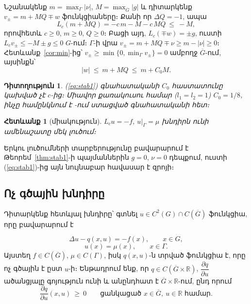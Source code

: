 \documentclass[12pt,a4paper]{article}
\makeatletter
\theoremstyle{arm}
\newtheorem{corollary}{Հետևանք}
\theoremstyle{armdef}
\newtheorem{remark}{Դիտողություն}
\renewcommand{\proofname}{Ապացույց։}
\renewenvironment{proof}[1][\proofname]{\par\pushQED{\qed}\normalfont\topsep6\p@\@plus6\p@\relax
  \trivlist\item[\hskip\labelsep\bfseries #1]\ignorespaces}{\popQED\endtrivlist\@endpefalse}
\numberwithin{equation}{section}
\newcommand{\G}{\overline{G}}
\newcommand{\dd}[2]{\dfrac{\partial #1}{\partial #2}}
\makeatother
\begin{document}
\begin{proof}
Նշանակենք $m=\max_\Gamma|\nu|$, $M=\max_{\G}|g|$ և դիտարկենք $v_{\pm}=m+MQ\mp w$ ֆունկցիաները։ Քանի որ $\Delta Q=-1$, ապա
\[L_c(m+MQ)=-c\,m-M-c\,MQ\ \le\ -M,\]
որովհետև $c\ge0$, $m\ge0$, $Q\ge0$։ Բացի այդ, $L_c(\mp w)=\pm g$, ուստի $L_cv_\pm\le-M\pm g\le0$ $G$-ում։ $\Gamma$-ի վրա $v_\pm=m+MQ\mp\nu\ge m-|\nu|\ge0$։ Հետևանք~\ref{cor:min}-ից՝ $v_\pm\ge\min\{0,\min_\Gamma v_\pm\}=0$ ամբողջ $\G$-ում, այսինքն՝
\begin{equation*}
|w|\ \le\ m+MQ\ \le\ m+C_0M.
\end{equation*}
\end{proof}

\begin{remark}
(\ref{eq:stab1}) գնահատականի $C_0$ հաստատունը կախված չէ $c$-ից։ Միավոր քառակուսու համար ($l_1=l_2=1$) $C_0=1/8$, ինչը համընկնում է \cite[էջ~548]{bakh}-ում ստացված գնահատականի հետ։
\end{remark}

\begin{corollary}[միակություն]\label{cor:uniq1}
$L_cu=-f$, $u|_\Gamma=\mu$ խնդիրն ունի ամենաշատը մեկ լուծում։
\end{corollary}

\begin{proof}
Երկու լուծումների տարբերությունը բավարարում է Թեորեմ~\ref{thm:stab1}-ի պայմաններին $g=0$, $\nu=0$ դեպքում, ուստի (\ref{eq:stab1})-ից այն նույնաբար հավասար է զրոյի։
\end{proof}

\subsection{Ոչ գծային խնդիրը}

Դիտարկենք հետևյալ խնդիրը՝ գտնել $u\in C^2(G)\cap C(\G)$ ֆունկցիա, որը բավարարում է

\begin{equation}\label{eq:nl}
\Delta u-q(x,u)=-f(x),\qquad x\in G,
\end{equation}
\begin{equation}\label{eq:nlbc}
u(x)=\mu(x),\qquad x\in\Gamma.
\end{equation}
Այստեղ $f\in C(\G)$, $\mu\in C(\Gamma)$, իսկ $q(x,u)$-ն տրված ֆունկցիա է, որը ոչ գծային է ըստ $u$-ի։ Ենթադրում ենք, որ $q\in C(\G\times\mathbb R)$, $\dfrac{\partial q}{\partial u}$ ածանցյալը գոյություն ունի և անընդհատ է $\G\times\mathbb R$-ում, ընդ որում
\begin{equation}\label{eq:mono}
\dd{q}{u}(x,u)\ \ge\ 0\qquad\text{ցանկացած }x\in\G,\ u\in\mathbb R\text{ համար}.
\end{equation}
\end{document}
